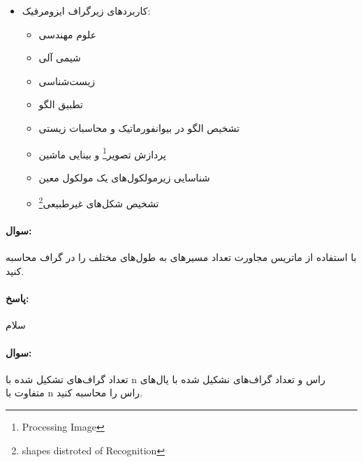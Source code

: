 \documentclass[a4paper,10pt]{article}
\begin{document}
\begin{itemize}
        \item کاربردهای زیرگراف ایزومرفیک:
        
        \begin{itemize}
            
            \item علوم مهندسی
            
            \item شیمی آلی

            \item زیست‌شناسی

            \item تطبیق الگو
            
            \item تشخیص الگو در بیوانفورماتیک و محاسبات زیستی

            \item پردازش تصویر\footnote{\hspace{2pt}Processing Image} و بینایی ماشین

            \item شناسایی زیرمولکول‌های یک مولکول‌ معین

            \item تشخیص شکل‌های غیرطبیعی\footnote{\hspace{2pt}shapes distroted of Recognition}

        \end{itemize}

    \end{itemize}

    \noindent\hrulefill

    \paragraph{سوال:} با استفاده از ماتریس مجاورت تعداد مسیرهای به طول‌های مختلف را در گراف محاسبه کنید.

    \paragraph{پاسخ:} سلام

    \noindent\hrulefill

    \paragraph{سوال:} تعداد گراف‌های تشکیل شده با n راس و تعداد گراف‌های نشکیل شده با یال‌های متفاوت با n راس را محاسبه کنید.
\end{document}
